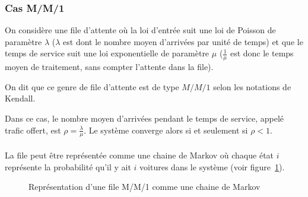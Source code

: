   \subsubsection{Cas M/M/1}
    On considère une file d'attente où la loi d'entrée suit une loi de Poisson
    de paramètre $\lambda$ ($\lambda$ est dont le nombre moyen d'arrivées par
    unité de temps) et que le temps de service suit une loi exponentielle de
    paramètre $\mu$ ($\frac 1 \mu$ est donc le temps moyen de traitement, sans
    compter l'attente dans la file).

    On dit que ce genre de file d'attente est de type $M/M/1$ selon les
    notations de Kendall.

    Dans ce cas, le nombre moyen d'arrivées pendant le temps de service, appelé
    trafic offert, est $\rho = \frac \lambda \mu$. Le système converge alors si
    et seulement si $\rho < 1$.
    
    \paragraph{}
    La file peut être représentée comme une chaine de Markov où chaque état $i$
    représente la probabilité qu'il y ait $i$ voitures dans le système (voir
    figure~\ref{fig:markov1}).

    \begin{figure}[h]
      \centering
      \caption{Représentation d'une file M/M/1 comme une chaine de Markov
        \cite{procstochs_cc}}
      \label{fig:markov1}
    \end{figure}

